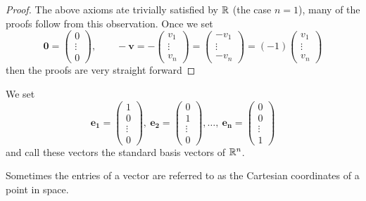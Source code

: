 \documentclass[10pt, a4paper]{article}
\newcommand{\mbf}[1]{\mathbf{#1}}
\begin{document}
\begin{proof}
    The above axioms ate trivially satisfied by $\mathbb{R}$ (the case $n = 1$), many of the proofs follow from this observation. Once we set
    \[
    \mbf{0} = \begin{pmatrix}
        0 \\
        \vdots \\
        0
    \end{pmatrix},
    \qquad
    -\mbf{v} = -\begin{pmatrix}
        v_1 \\
        \vdots \\
        v_n
    \end{pmatrix}
    =
    \begin{pmatrix}
        -v_1 \\
        \vdots \\
        -v_n
    \end{pmatrix}
    =
    (-1)\begin{pmatrix}
        v_1 \\
        \vdots \\
        v_n
    \end{pmatrix}
    \]
    then the proofs are very straight forward
\end{proof}

\begin{definition}
    We set
    \[
    \mbf{e_1} = \begin{pmatrix}
        1 \\
        0 \\
        \vdots \\
        0
    \end{pmatrix},
    \ 
    \mbf{e_2} = \begin{pmatrix}
        0 \\
        1 \\
        \vdots \\
        0
    \end{pmatrix},
    \dotsc,\ 
    \mbf{e_n} = \begin{pmatrix}
        0 \\
        0 \\
        \vdots \\
        1
    \end{pmatrix}
    \]
    and call these vectors the standard basis vectors of $\mathbb{R} ^ n$.
\end{definition}
Sometimes the entries of a vector are referred to as the Cartesian coordinates of a point in space.
\end{document}
